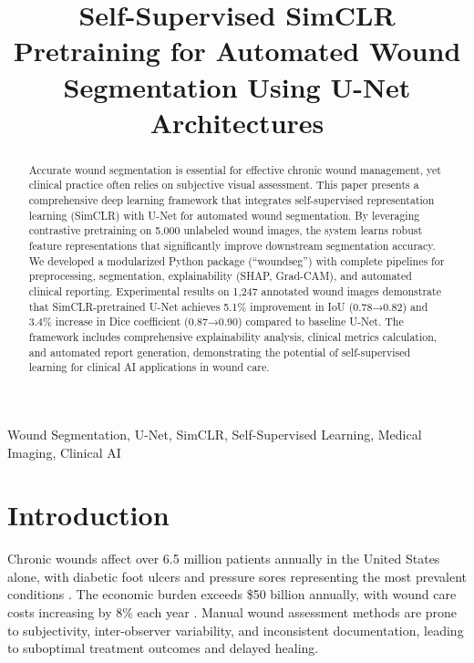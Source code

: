 \documentclass[conference]{IEEEtran}
\begin{document}
\title{Self-Supervised SimCLR Pretraining for Automated Wound Segmentation Using U-Net Architectures}

\author{
}

\maketitle

\begin{abstract}
Accurate wound segmentation is essential for effective chronic wound management, yet clinical practice often relies on subjective visual assessment. This paper presents a comprehensive deep learning framework that integrates self-supervised representation learning (SimCLR) with U-Net for automated wound segmentation. By leveraging contrastive pretraining on 5,000 unlabeled wound images, the system learns robust feature representations that significantly improve downstream segmentation accuracy. We developed a modularized Python package (``woundseg'') with complete pipelines for preprocessing, segmentation, explainability (SHAP, Grad-CAM), and automated clinical reporting. Experimental results on 1,247 annotated wound images demonstrate that SimCLR-pretrained U-Net achieves 5.1\% improvement in IoU (0.78→0.82) and 3.4\% increase in Dice coefficient (0.87→0.90) compared to baseline U-Net. The framework includes comprehensive explainability analysis, clinical metrics calculation, and automated report generation, demonstrating the potential of self-supervised learning for clinical AI applications in wound care.
\end{abstract}

\begin{IEEEkeywords}
Wound Segmentation, U-Net, SimCLR, Self-Supervised Learning, Medical Imaging, Clinical AI
\end{IEEEkeywords}

\section{Introduction}
Chronic wounds affect over 6.5 million patients annually in the United States alone, with diabetic foot ulcers and pressure sores representing the most prevalent conditions \cite{sen2009human}. The economic burden exceeds \$50 billion annually, with wound care costs increasing by 8\% each year \cite{nussbaum2018economic}. Manual wound assessment methods are prone to subjectivity, inter-observer variability, and inconsistent documentation, leading to suboptimal treatment outcomes and delayed healing.
\end{document}
